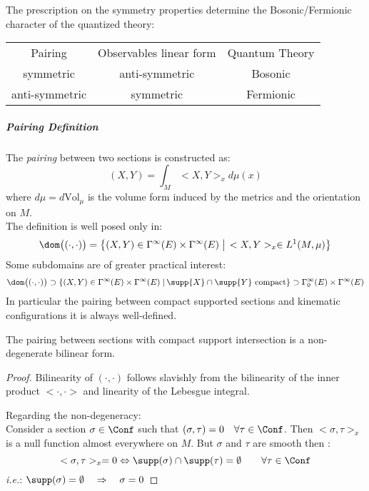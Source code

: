 \documentclass[Main]{subfiles}
\begin{document}
			\begin{observation}
				The prescription on the symmetry properties determine the Bosonic/Fermionic character of the quantized theory:\\
				\begin{tabular}{c c c}
					Pairing & Observables linear form & Quantum Theory\\
					symmetric  & anti-symmetric &  Bosonic \\
					anti-symmetric & symmetric & Fermionic 
				\end{tabular}		
			\end{observation}
			
			\subparagraph{Pairing Definition}
			
				The \emph{pairing} between two sections is constructed as:
   					\begin{displaymath}
   								(X,Y) = \int_M <X,Y>_x d\mu(x)
   					\end{displaymath}
   				where $d\mu = d\textrm{Vol}_\mu$ is the volume form induced by the metrics and the orientation on $M$.\\
   				The definition is well posed only in:
   				\begin{displaymath}
   					\dom\big( (\cdot, \cdot) \big) = 
   					\big\{(X,Y) \in \Gamma^\infty(E) \times \Gamma^\infty(E) \; \big\vert \,  <X,Y>_x \in L^1(M,\mu)\big \}
   				\end{displaymath}
   				Some subdomains are of greater practical interest:
   				\begin{displaymath}
   					\dom\big( (\cdot, \cdot) \big) \supset \{ (X,Y) \in \Gamma^\infty(E) \times \Gamma^\infty(E) \; \vert \, \supp{X} \cap \supp{Y} \textrm{ compact} \} \supset \Gamma^\infty_0 (E) \times \Gamma^\infty(E)
   				\end{displaymath}
   				In particular the pairing between compact supported sections and kinematic configurations it is always well-defined.
   				\begin{proposition}
   					The pairing between sections with compact support intersection is a non-degenerate bilinear form.
   				\end{proposition}
   				\begin{proof}
					Bilinearity of $(\cdot,\cdot)$ follows slavishly from the bilinearity of the inner product $<\cdot,\cdot>$ and linearity of the Lebesgue integral.
					
					Regarding the non-degeneracy:\\
   					Consider a section $\sigma \in \Conf$ such that $(\sigma, \tau) = 0 \quad \forall \tau \in \Conf$.
   					Then $<\sigma, \tau>_x$ is a null function almost everywhere on $M$.
   					But $\sigma$ and $\tau$ are smooth then :
   					\begin{displaymath}
   						<\sigma, \tau >_x = 0 \Leftrightarrow \supp(\sigma) \cap \supp(\tau) = \emptyset \qquad \forall \tau \in \Conf
   					\end{displaymath}
   					\textit{i.e.}: $\supp(\sigma) = \emptyset \quad \Rightarrow \quad \sigma=0$
   				\end{proof}
   				
\end{document}
